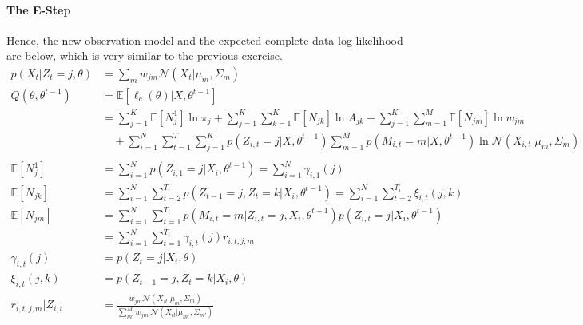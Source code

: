 \documentclass[11pt, letterpaper]{article}
\begin{document}
\paragraph{The E-Step}
Hence, the new observation model and the expected complete data log-likelihood are below, which is very similar to the previous exercise.
\begin{align*}
    p(X_t|Z_t = j, \theta) &= \sum_m w_{jm} \mathcal{N}(X_t|\mu_m, \Sigma_m) \\
    Q(\theta, \theta^{t-1}) &= \mathbb{E}[\ell_c(\theta) | X, \theta^{t-1}] \\
        &= \sum_{j=1}^K \mathbb{E}[N_j^1] \ln \pi_j
        + \sum_{j=1}^K \sum_{k=1}^K \mathbb{E}[N_{jk}] \ln A_{jk} 
        + \sum_{j=1}^K\sum_{m=1}^M \mathbb{E}[N_{jm}] \ln w_{jm} \\
        & \quad
        + \sum_{i=1}^N \sum_{t=1}^T \sum_{j=1}^K p(Z_{i,t}=j|X, \theta^{t-1})
            \sum_{m=1}^M p(M_{i,t}=m|X,\theta^{t-1}) \ln \mathcal{N}(X_{i,t}|\mu_m, \Sigma_m) \\ \\
    \mathbb{E}[N_j^1] &= \sum_{i=1}^N p(Z_{i,1}=j | X_i, \theta^{t-1}) = \sum_{i=1}^N \gamma_{i,1}(j) \\
    \mathbb{E}[N_{jk}] &= \sum_{i=1}^N \sum_{t=2}^{T_i} p(Z_{t-1}=j, Z_t=k|X_i, \theta^{t-1})
        = \sum_{i=1}^N \sum_{t=2}^{T_i} \xi_{i,t}(j, k) \\
    \mathbb{E}[N_{jm}] &= \sum_{i=1}^N \sum_{t=1}^{T_i}
        p(M_{i,t}=m|Z_{i,t}=j, X_i, \theta^{t-1}) p(Z_{i,t}=j|X_i, \theta^{t-1}) \\
        &= \sum_{i=1}^N \sum_{t=1}^{T_i} \gamma_{i,t}(j) r_{i,t,j,m} \\
    \gamma_{i,t}(j) &= p(Z_t=j|X_i, \theta) \\
    \xi_{i,t}(j, k) &= p(Z_{t-1}=j, Z_t=k|X_i, \theta) \\
    r_{i,t,j,m}|Z_{i,t} &=
        \frac{w_{jm} \mathcal{N}(X_{it}|\mu_m, \Sigma_m)}
             {\sum_{m'}^M w_{jm'} \mathcal{N}(X_{it}|\mu_{m'}, \Sigma_{m'})}
\end{align*}
\end{document}
